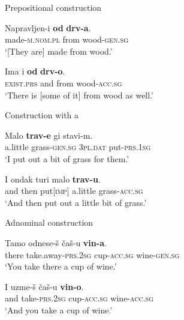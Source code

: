 \documentclass[output=paper,colorlinks,citecolor=brown]{langscibook}
\begin{document}
\begin{exe}
\ex Prepositional construction
\begin{xlist}
	\ex 
	\gll Napravljen-i \textbf{od} \textbf{drv-a}. \\
	made-\textsc{m.nom.pl} from wood-\textsc{gen.sg} \\
	\trans ‘[They are] made from wood.’
	
	\ex 
	\gll Ima i \textbf{od} \textbf{drv-o}. \\
	\textsc{exist.prs} and from wood-\textsc{acc.sg} \\
	\trans ‘There is [some of it] from wood as well.’
\end{xlist}
\end{exe}

\begin{exe}
\ex Construction with a 
\begin{xlist}
	\ex 
	\gll Malo \textbf{trav-e} gi stavi-m. \\
	a.little grass-\textsc{gen.sg} 3\textsc{pl.dat} put-\textsc{prs.1sg} \\
	\trans ‘I put out a bit of grass for them.’
	
	\ex 
	\gll I ondak turi malo \textbf{trav-u}. \\
	and then put[\textsc{imp}] a.little grass-\textsc{acc.sg} \\
	\trans ‘And then put out a little bit of grass.’
\end{xlist}
\end{exe}

\begin{exe}
\ex Adnominal construction
\begin{xlist}
	\ex 
	\gll Tamo odnese-š čaš-u \textbf{vin-a}. \\
	there take.away-\textsc{prs.2sg} cup-\textsc{acc.sg} wine-\textsc{gen.sg} \\
	\trans ‘You take there a cup of wine.’
	
	\ex 
	\gll I uzme-š čaš-u \textbf{vin-o}. \\
	and take-\textsc{prs.2sg} cup-\textsc{acc.sg} wine-\textsc{acc.sg} \\
	\trans ‘And you take a cup of wine.’
\end{xlist}
\end{exe}
\end{document}

